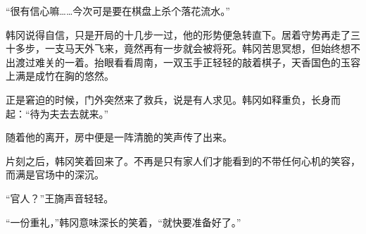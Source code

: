 “很有信心嘛……今次可是要在棋盘上杀个落花流水。”

韩冈说得自信，只是开局的十几步一过，他的形势便急转直下。居着守势再走了三十多步，一支马天外飞来，竟然再有一步就会被将死。韩冈苦思冥想，但始终想不出渡过难关的一着。抬眼看看周南，一双玉手正轻轻的敲着棋子，天香国色的玉容上满是成竹在胸的悠然。

正是窘迫的时候，门外突然来了救兵，说是有人求见。韩冈如释重负，长身而起：“待为夫去去就来。”

随着他的离开，房中便是一阵清脆的笑声传了出来。

片刻之后，韩冈笑着回来了。不再是只有家人们才能看到的不带任何心机的笑容，而满是官场中的深沉。

“官人？”王旖声音轻轻。

“一份重礼，”韩冈意味深长的笑着，“就快要准备好了。”

